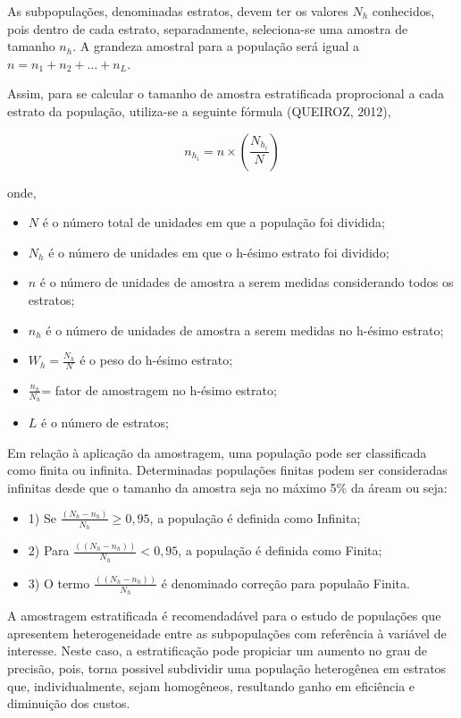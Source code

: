 As subpopulações, denominadas estratos, devem ter os valores
$N_{h}$ conhecidos, pois dentro de cada estrato, separadamente,
seleciona-se uma amostra de tamanho $n_{h}$. A grandeza amostral
para a população será igual a $n=n_{1}+n_{2}+\ldots+n_{L}$.
\vskip0.3cm

Assim, para se calcular o tamanho de amostra estratificada
proprocional a cada estrato da população, utiliza-se a seguinte
fórmula (QUEIROZ, 2012),

\begin{equation}\label{amostestra}
n_{h_{i}} = n \times \left ( \frac{N_{h_{i}}}{N} \right )
\end{equation}

onde, 

\begin{itemize}
\item $N$ é o número total de unidades em que a população foi dividida;
\item $N_{h}$ é o número de unidades em que o h-ésimo estrato foi dividido;
\item $n$ é o número de unidades de amostra a serem medidas considerando todos os estratos;
\item $n_{h}$ é o número de unidades de amostra a serem medidas no h-ésimo estrato;
\item $W_{h}={\frac{N_{h}}{N}}$ é o peso do h-ésimo estrato;
\item $\frac{n_{h}}{N_{h}}$= fator de amostragem no h-ésimo estrato; 
\item $L$ é o número de estratos;
\end{itemize}

Em relação à aplicação da amostragem, uma população pode ser classificada como finita ou infinita. Determinadas populações finitas podem ser consideradas infinitas desde que o tamanho da amostra seja no máximo 5\% da áream ou seja:

\begin{itemize}
    \item 1) Se $\frac{(N_{h}-n_{h})}{N_{h}} \geqslant 0,95$, a população é definida como Infinita; 
    \item 2) Para $\frac{((N_{h}-n_{h}))}{N_{h}} < 0,95$, a população é definida como Finita;
    \item 3) O termo $\frac{((N_{h}-n_{h}))}{N_{h}}$ é denominado correção para populaão Finita.
\end{itemize}


A amostragem estratificada é recomendadável para o estudo de populações que apresentem heterogeneidade entre as subpopulações com referência à variável de interesse. Neste caso, a estratificação pode propiciar um aumento no grau de precisão, pois, torna possivel subdividir uma população heterogênea em estratos que, individualmente, sejam homogêneos, resultando ganho em eficiência e diminuição dos custos.\vskip0.3cm


